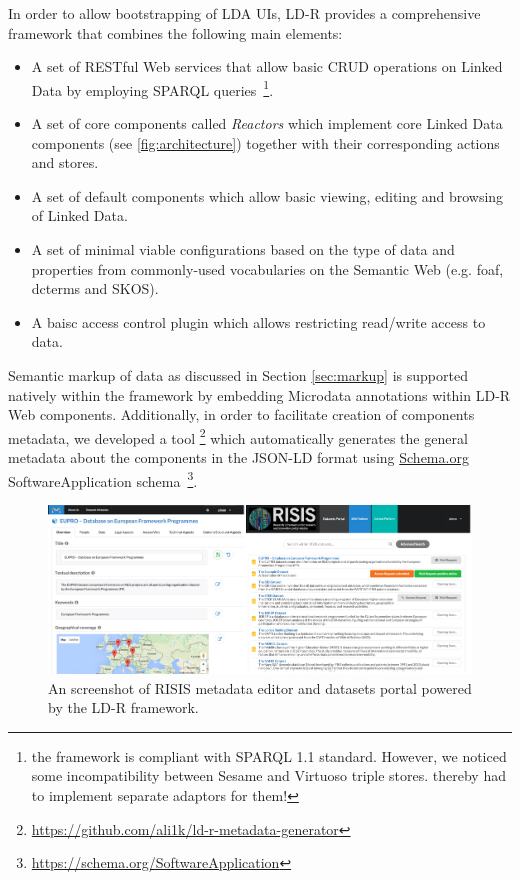\documentclass{acm_proc_article-sp}
\begin{document}
In order to allow bootstrapping of LDA UIs, LD-R provides a comprehensive framework that combines the following main elements:
\begin{itemize}

\item A set of RESTful Web services that allow basic CRUD operations on Linked Data by  employing SPARQL queries~\footnote{the framework is compliant with SPARQL 1.1 standard. However, we noticed some incompatibility between Sesame and Virtuoso triple stores. thereby had to implement separate adaptors for them!}.

\item A set of core components called \emph{Reactors} which implement core Linked Data components (see \autoref{fig:architecture}) together with their corresponding actions and stores.

\item A set of default components which allow basic viewing, editing and browsing of Linked Data.

\item A set of minimal viable configurations based on the type of data and properties from commonly-used vocabularies on the Semantic Web (e.g. foaf, dcterms and SKOS).

\item A baisc access control plugin which allows restricting read/write access to data.

\end{itemize}


Semantic markup of data as discussed in Section \ref{sec:markup} is supported natively within the framework by embedding Microdata annotations within LD-R Web components.
Additionally, in order to facilitate creation of components metadata, we developed a tool \footnote{\url{https://github.com/ali1k/ld-r-metadata-generator}} which automatically generates the general metadata about the components in the JSON-LD format using \url{Schema.org} SoftwareApplication schema~\footnote{\url{https://schema.org/SoftwareApplication}}.

\begin{figure}[ht] 
  \includegraphics[width=1\linewidth]{images/screenshots.jpg}
  \caption{An screenshot of RISIS metadata editor and datasets portal powered by the LD-R framework.}
\end{figure}
\end{document}
